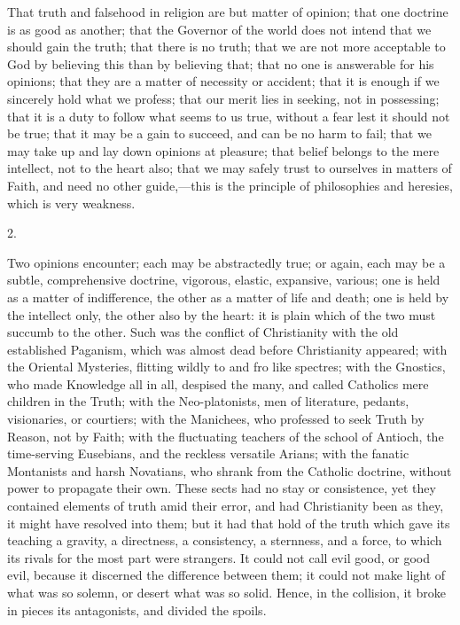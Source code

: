 That truth and falsehood in religion are but matter of
opinion; that one doctrine is as good as another; that
the Governor of the world does not intend that we should
gain the truth; that there is no truth; that we are not
more acceptable to God by believing this than by
believing that; that no one is answerable for his
opinions; that they are a matter of necessity or
accident; that it is enough if we sincerely hold what we
profess; that our merit lies in seeking, not in
possessing; that it is a duty to follow what seems to us
true, without a fear lest it should not be true; that it
may be a gain to succeed, and can be no harm to fail;
that we may take up and lay down opinions at pleasure;
that belief belongs to the mere intellect, not to the
heart also; that we may safely trust to ourselves in
matters of Faith, and need no other guide,—this is
the principle of philosophies and heresies, which is very
weakness.

2.

Two opinions encounter; each may be abstractedly true;
or again, each may be a subtle, comprehensive doctrine,
vigorous, elastic, expansive, various; one is held as a
matter of indifference, the other as a matter of life and
death; one is held by the intellect only, the other also
by the heart: it is plain which of the two must succumb
to the other. Such was the conflict of Christianity with
the old established Paganism, which was almost dead
before Christianity appeared; with the Oriental
Mysteries, flitting wildly to and fro like spectres; with
the Gnostics, who made Knowledge all in all, despised the
many, and called Catholics mere children in the Truth;
with the Neo-platonists, men of literature, pedants,
visionaries, or courtiers; with the Manichees, who
professed to seek Truth by Reason, not by Faith; with the
fluctuating teachers of the school of Antioch, the
time-serving Eusebians, and the reckless versatile
Arians; with the fanatic Montanists and harsh Novatians,
who shrank from the Catholic doctrine, without power to
propagate their own. These sects had no stay or
consistence, yet they contained elements of truth amid
their error, and had Christianity been as they, it might
have resolved into them; but it had that hold of the
truth which gave its teaching a gravity, a directness, a
consistency, a sternness, and a force, to which its
rivals for the most part were strangers. It could not
call evil good, or good evil, because it discerned the
difference between them; it could not make light of what
was so solemn, or desert what was so solid. Hence, in the
collision, it broke in pieces its antagonists, and
divided the spoils.

